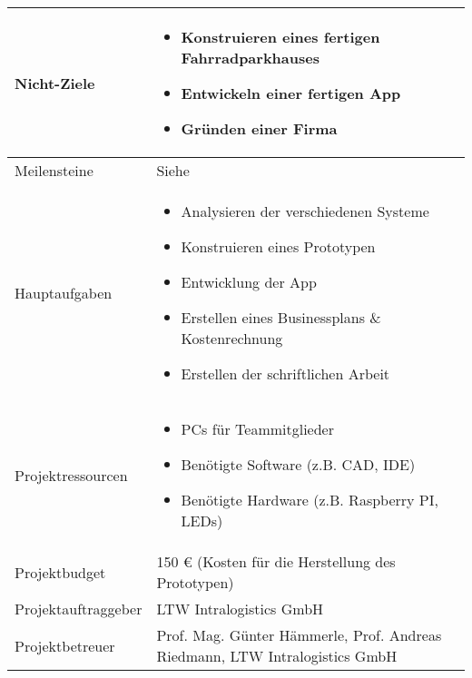 \begin{longtable}{p{}|p{}}
  Nicht-Ziele           &
  \begin{itemize}
    \item Konstruieren eines fertigen Fahrradparkhauses
    \item Entwickeln einer fertigen App
    \item Gründen einer Firma
  \end{itemize}                                                                     \\  \hline

  Meilensteine          & Siehe \nameref{tab:meilensteine}                                                               \\ \hline

  Hauptaufgaben         &
  \begin{itemize}
    \item Analysieren der verschiedenen Systeme
    \item Konstruieren eines Prototypen
    \item Entwicklung der App
    \item Erstellen eines Businessplans \& Kostenrechnung
    \item Erstellen der schriftlichen Arbeit
  \end{itemize}                                                                   \\  \hline

  Projektressourcen     &
  \begin{itemize}
    \item PCs für Teammitglieder
    \item Benötigte Software (z.B. \ac{CAD}, \ac{IDE})
    \item Benötigte Hardware (z.B. Raspberry PI, LEDs)
  \end{itemize}                                                                      \\  \hline

  Projektbudget         & 150 \euro{} (Kosten für die Herstellung des Prototypen)                                        \\ \hline

  Projektauftraggeber   & LTW Intralogistics GmbH                                                                        \\ \hline

  Projektbetreuer       & Prof. Mag. Günter Hämmerle, Prof. Andreas Riedmann, LTW Intralogistics GmbH                    \\ \hline


\end{longtable}
